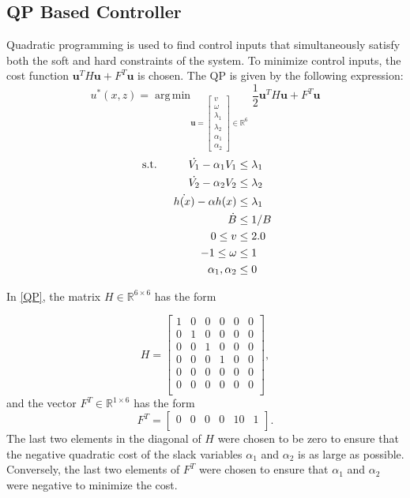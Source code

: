 \documentclass[journal]{IEEEtran}
\DeclareMathOperator*{\argmin}{arg\,min}
\begin{document}
\subsection{QP Based Controller}
Quadratic programming is used to find control inputs that simultaneously satisfy both the soft and hard constraints of the system. To minimize control inputs, the cost function $\textbf{u}^TH\textbf{u}+F^T\textbf{u}$ is chosen. The QP is given by the following expression:
\begin{equation}
u^*(x,z) = \argmin_{\textbf{u}=
\left[\begin{matrix}
v\\
\omega\\
\lambda_1\\
\lambda_2\\
\alpha_1\\
\alpha_2
\end{matrix}\right]
\in \mathbb{R}^6}
\frac{1}{2}\textbf{u}^TH\textbf{u}+F^T\textbf{u} 
\label{QP}
\end{equation}
\begin{align}
\text{ s.t.\hspace{1cm}}
\dot{V_1} -\alpha_1 V_1 & \leq\lambda_1\\
\dot{V_2} -\alpha_2 V_2 & \leq\lambda_2\\
\dot{h(x)}-\alpha h(x) & \leq \lambda_1\\
\dot{B} & \leq 1/B\\
0 \leq v & \leq 2.0\\
-1\leq \omega & \leq 1\\
\alpha_1,\alpha_2 & \leq 0
\end{align}

In \eqref{QP}, the matrix $H\in \mathbb{R}^{6\times 6}$ has the form

\begin{equation}
H=\left[ \begin{matrix}
1 & 0 &0&0& 0 & 0\\
0 &1& 0 &0& 0& 0\\
0& 0 &1& 0& 0& 0\\
0& 0& 0& 1& 0& 0\\
0& 0& 0& 0& 0& 0\\
0& 0& 0& 0& 0& 0\\
\end{matrix}\right],
\end{equation}
and the vector $F^T\in \mathbb{R}^{1\times 6}$ has the form 
\begin{equation}
F^T=\left[ \begin{matrix}
0 & 0 &0&0& 10 & 1\\
\end{matrix}\right].
\end{equation} The last two elements in the diagonal of $H$ were chosen to be zero to ensure that the negative quadratic cost of the slack variables $\alpha_1$ and $\alpha_2$ is as large as possible. Conversely, the last two elements of $F^T$ were chosen to ensure that $\alpha_1$ and $\alpha_2$ were negative to minimize the cost.
\end{document}
